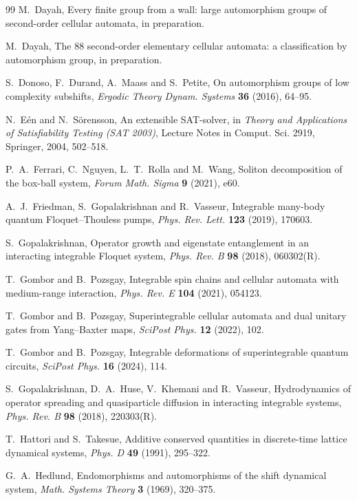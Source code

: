 \begin{thebibliography}{99}
 M.~Dayah, Every finite group from a wall: large automorphism groups of second-order cellular automata, in preparation.

 M.~Dayah, The 88 second-order elementary cellular automata: a classification by automorphism group, in preparation.

 S.~Donoso, F.~Durand, A.~Maass and S.~Petite, On automorphism groups of low complexity subshifts, \emph{Ergodic Theory Dynam. Systems} \textbf{36} (2016), 64--95.

 N.~E\'en and N.~S\"orensson, An extensible SAT-solver, in \emph{Theory and Applications of Satisfiability Testing (SAT 2003)}, Lecture Notes in Comput. Sci. 2919, Springer, 2004, 502--518.

 P.~A.~Ferrari, C.~Nguyen, L.~T.~Rolla and M.~Wang, Soliton decomposition of the box-ball system, \emph{Forum Math. Sigma} \textbf{9} (2021), e60.

 A.~J.~Friedman, S.~Gopalakrishnan and R.~Vasseur, Integrable many-body quantum Floquet--Thouless pumps, \emph{Phys. Rev. Lett.} \textbf{123} (2019), 170603.

 S.~Gopalakrishnan, Operator growth and eigenstate entanglement in an interacting integrable Floquet system, \emph{Phys. Rev. B} \textbf{98} (2018), 060302(R).

 T.~Gombor and B.~Pozsgay, Integrable spin chains and cellular automata with medium-range interaction, \emph{Phys. Rev. E} \textbf{104} (2021), 054123.

 T.~Gombor and B.~Pozsgay, Superintegrable cellular automata and dual unitary gates from Yang--Baxter maps, \emph{SciPost Phys.} \textbf{12} (2022), 102.

 T.~Gombor and B.~Pozsgay, Integrable deformations of superintegrable quantum circuits, \emph{SciPost Phys.} \textbf{16} (2024), 114.

 S.~Gopalakrishnan, D.~A.~Huse, V.~Khemani and R.~Vasseur, Hydrodynamics of operator spreading and quasiparticle diffusion in interacting integrable systems, \emph{Phys. Rev. B} \textbf{98} (2018), 220303(R).

 T.~Hattori and S.~Takesue, Additive conserved quantities in discrete-time lattice dynamical systems, \emph{Phys. D} \textbf{49} (1991), 295--322.

 G.~A.~Hedlund, Endomorphisms and automorphisms of the shift dynamical system, \emph{Math. Systems Theory} \textbf{3} (1969), 320--375.


\end{thebibliography}
